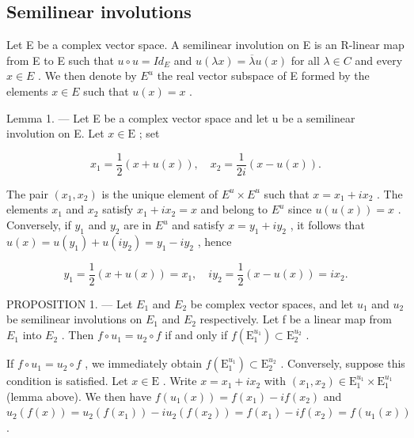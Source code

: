 \subsection{Semilinear involutions}

Let E be a complex vector space. A semilinear involution on E is an R-linear map from E to E such that \(u \circ u = Id_{E}\) and \(u(\lambda x) = \overline{\lambda}u(x)\) for all \(\lambda \in C\) and every \(x \in E\) . We then denote by \(E^{u}\) the real vector subspace of E formed by the elements \(x \in E\) such that \(u(x) = x\) .

Lemma 1. --- Let E be a complex vector space and let u be a semilinear involution on E. Let \(x \in \mathrm{E}\) ; set

\[
x _ {1} = \frac {1}{2} (x + u (x)), \quad x _ {2} = \frac {1}{2 i} (x - u (x)).
\]

The pair \((x_{1}, x_{2})\) is the unique element of \(E^{u} \times E^{u}\) such that \(x = x_{1} + ix_{2}\) . The elements \(x_{1}\) and \(x_{2}\) satisfy \(x_{1} + ix_{2} = x\) and belong to \(E^{u}\) since \(u(u(x)) = x\) . Conversely, if \(y_{1}\) and \(y_{2}\) are in \(E^{u}\) and satisfy \(x = y_{1} + iy_{2}\) , it follows that \(u(x) = u(y_{1}) + u(iy_{2}) = y_{1} - iy_{2}\) , hence

\[
y _ {1} = \frac {1}{2} (x + u (x)) = x _ {1}, \quad i y _ {2} = \frac {1}{2} (x - u (x)) = i x _ {2}.
\]

PROPOSITION 1. --- Let \(E_{1}\) and \(E_{2}\) be complex vector spaces, and let \(u_{1}\) and \(u_{2}\) be semilinear involutions on \(E_{1}\) and \(E_{2}\) respectively. Let f be a linear map from \(E_{1}\) into \(E_{2}\) . Then \(f \circ u_{1} = u_{2} \circ f\) if and only if \(f(\mathrm{E}_{1}^{u_{1}}) \subset \mathrm{E}_{2}^{u_{2}}\) .

If \(f \circ u_1 = u_2 \circ f\) , we immediately obtain \(f(\mathrm{E}_1^{u_1}) \subset \mathrm{E}_2^{u_2}\) . Conversely, suppose this condition is satisfied. Let \(x \in \mathrm{E}\) . Write \(x = x_1 + ix_2\) with \((x_1, x_2) \in \mathrm{E}_1^{u_1} \times \mathrm{E}_1^{u_1}\) (lemma above). We then have \(f(u_1(x)) = f(x_1) - if(x_2)\) and \(u_2(f(x)) = u_2(f(x_1)) - iu_2(f(x_2)) = f(x_1) - if(x_2) = f(u_1(x))\) .

